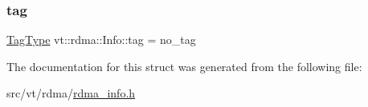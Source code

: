 \subsubsection{\texorpdfstring{tag}{tag}}
{\footnotesize\ttfamily \hyperlink{namespacevt_a84ab281dae04a52a4b243d6bf62d0e52}{Tag\+Type} vt\+::rdma\+::\+Info\+::tag = no\+\_\+tag}



The documentation for this struct was generated from the following file\+:\begin{DoxyCompactItemize}
\item 
src/vt/rdma/\hyperlink{rdma__info_8h}{rdma\+\_\+info.\+h}\end{DoxyCompactItemize}
